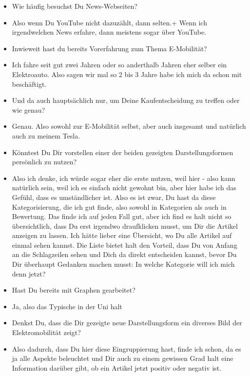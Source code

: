 {\begin{itemize}[]
    Ähnlich wie auf der YouTube-Startseite.
    Also ebenfalls mit Kategorien beziehungsweise Rubriken.
    Und dann halt typische Internetforen.
    \item {} Wie häufig besuchst Du News-Webseiten?
    \item {} Also wenn Du YouTube nicht dazuzählt, dann selten.+
    Wenn ich irgendwelchen News erfahre, dann meistens sogar über YouTube.
    \item {} Inwieweit hast du bereits Vorerfahrung zum Thema E-Mobilität?
    \item {} Ich fahre seit gut zwei Jahren oder so anderthalb Jahren eher selber ein Elektroauto.
    Also sagen wir mal so 2 bis 3 Jahre habe ich mich da schon mit beschäftigt. 
    \item {} Und da auch hauptsächlich nur, um Deine Kaufentscheidung zu treffen oder wie genau?
    \item {} Genau. 
    Also sowohl zur E-Mobilität selbst, aber auch insgesamt und natürlich auch zu meinem Tesla.
    \item {} Könntest Du Dir vorstellen einer der beiden gezeigten Darstellungsformen persönlich zu nutzen?
    \item {} Also ich denke, ich würde sogar eher die erste nutzen, weil hier - also kann natürlich sein, weil ich es einfach nicht gewohnt bin, aber hier habe ich das Gefühl, dass es umständlicher ist.
    Also es ist zwar, Du hast da diese Kategorisierung, die ich gut finde, also sowohl in Kategorien als auch in Bewertung.
    Das finde ich auf jeden Fall gut, aber ich find es halt nicht so übersichtlich, dass Du erst irgendwo draufklicken musst, um Dir die Artikel anzeigen zu lassen.
    Ich hätte lieber eine Übersicht, wo Du alle Artikel auf einmal sehen kannst.
    Die Liste bietet halt den Vorteil, dass Du von Anfang an die Schlagzeilen sehen und Dich da direkt entscheiden kannst, bevor Du Dir überhaupt Gedanken machen musst: In welche Kategorie will ich mich denn jetzt?
    \item {} Hast Du bereits mit Graphen gearbeitet?
    \item {} Ja, also das Typische in der Uni halt
    \item {} Denkst Du, dass die Dir gezeigte neue Darstellungsform ein diverses Bild der Elektromobilität zeigt?
    \item {} Also dadurch, dass Du hier diese Eingruppierung hast, finde ich schon, da es ja alle Aspekte beleuchtet und Dir auch zu einem gewissen Grad halt eine Information darüber gibt, ob ein Artikel jetzt positiv oder negativ ist.

\end{itemize}}
